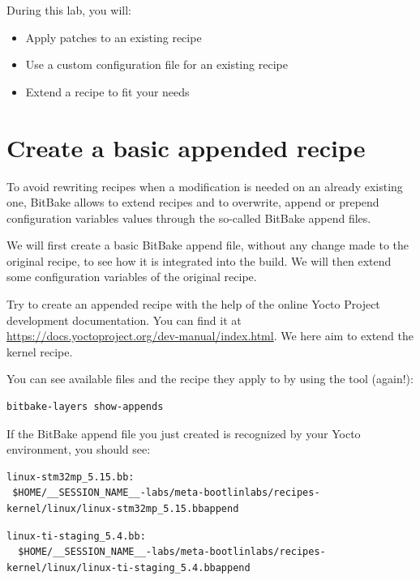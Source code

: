 
During this lab, you will:
\begin{itemize}
  \item Apply patches to an existing recipe
  \item Use a custom configuration file for an existing recipe
  \item Extend a recipe to fit your needs
\end{itemize}

\section{Create a basic appended recipe}

To avoid rewriting recipes when a modification is needed on an already existing
one, BitBake allows to extend recipes and to overwrite, append or prepend
configuration variables values through the so-called BitBake append files.

We will first create a basic BitBake append file, without any change made
to the original recipe, to see how it is integrated into the build. We will then
extend some configuration variables of the original recipe.

Try to create an appended recipe with the help of the online Yocto
Project development documentation. You can find it at
\url{https://docs.yoctoproject.org/dev-manual/index.html}. We here
aim to extend the 
{} kernel recipe.

You can see available  files and the recipe they apply to by
using the  tool (again!):
\begin{verbatim}
bitbake-layers show-appends
\end{verbatim}

If the BitBake append file you just created is recognized by your Yocto
environment, you should see:
\if{}
\begin{verbatim}
linux-stm32mp_5.15.bb:
 $HOME/__SESSION_NAME__-labs/meta-bootlinlabs/recipes-kernel/linux/linux-stm32mp_5.15.bbappend
\end{verbatim}
\else
\begin{verbatim}
linux-ti-staging_5.4.bb:
  $HOME/__SESSION_NAME__-labs/meta-bootlinlabs/recipes-kernel/linux/linux-ti-staging_5.4.bbappend
\end{verbatim}
\fi

